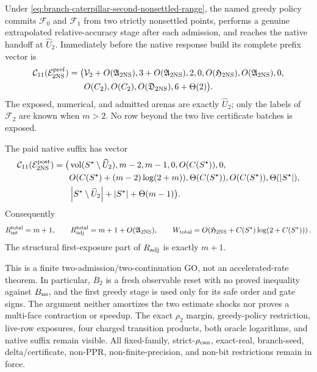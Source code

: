 \begin{theorem}
\label{thm:branch-caterpillar-two-nonsettled-continuation}
Under \cref{eq:branch-caterpillar-second-nonsettled-range}, the named greedy
policy commits $\mathcal F_0$ and $\mathcal F_1$ from two strictly nonsettled
points, performs a genuine extrapolated relative-accuracy stage after each
admission, and reaches the native handoff at $\widehat U_2$.  Immediately
before the native response build its complete prefix vector is
\begin{equation}
 \begin{aligned}
 \mathcal C_{11}(\mathcal E_{\rm 2NS}^{\rm pref})=\bigl(&
 \mathcal V_2+O(\mathfrak A_{\rm 2NS}),
 3+O(\mathfrak A_{\rm 2NS}),2,0,O(\mathfrak H_{\rm 2NS}),
 O(\mathfrak A_{\rm 2NS}),0,\\
 &O(C_2),O(C_2),O(\mathfrak D_{\rm 2NS}),6+\Theta(2)\bigr).
 \end{aligned}
 \label{eq:branch-caterpillar-two-nonsettled-prefix-eleven-vector}
\end{equation}
The exposed, numerical, and admitted arenas are exactly $\widehat U_2$;
only the labels of $\mathcal F_2$ are known when $m>2$.  No row beyond the
two live certificate batches is exposed.

The paid native suffix has vector
\begin{equation}
 \begin{aligned}
 \mathcal C_{11}(\mathcal E_{\rm 2NS}^{\rm post})=\bigl(&
 \operatorname{vol}(S^\star\setminus\widehat U_2),m-2,m-1,0,
 O(C(S^\star)),0,\\
 &O(C(S^\star)+(m-2)\log(2+m)),
 \Theta(C(S^\star)),O(C(S^\star)),\Theta(\left\lvert S^\star \right\rvert),\\
 &\left\lvert S^\star\setminus\widehat U_2 \right\rvert
  +\left\lvert S^\star \right\rvert+\Theta(m-1)\bigr).
 \end{aligned}
 \label{eq:branch-caterpillar-two-nonsettled-post-eleven-vector}
\end{equation}
Consequently
\begin{equation}
 R_{\rm int}^{\rm total}=m+1,
 \qquad
 R_{\rm adj}^{\rm total}=m+1+O(\mathfrak A_{\rm 2NS}),
 \qquad
 W_{\rm total}=O\!\left(
  \mathfrak H_{\rm 2NS}+C(S^\star)\log(2+C(S^\star))\right).
 \label{eq:branch-caterpillar-two-nonsettled-total-work}
\end{equation}
The structural first-exposure part of $R_{\rm adj}$ is exactly $m+1$.

This is a finite two-admission/two-continuation GO, not an accelerated-rate
theorem.  In particular, $B_2$ is a fresh observable reset with no proved
inequality against $B_{\rm ns}$, and the first greedy stage is used only for
its safe order and gate signs.  The argument neither amortizes the two
estimate shocks nor proves a multi-face contraction or speedup.  The exact
$\rho_2$ margin, greedy-policy restriction, live-row exposures, four charged
transition products, both oracle logarithms, and native suffix remain
visible.  All fixed-family, strict-$\rho_{\rm can}$, exact-real, branch-seed,
delta/certificate, non-PPR, non-finite-precision, and non-bit restrictions
remain in force.
\end{theorem}

